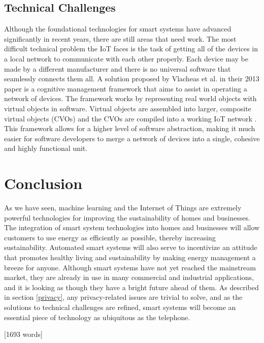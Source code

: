 \documentclass[letterpaper]{article}
\begin{document}
\subsection{Technical Challenges} \label{tech}
Although the foundational technologies for smart systems have advanced significantly in recent years, there are still areas that need work. The most difficult technical problem the IoT faces is the task of getting all of the devices in a local network to communicate with each other properly. Each device may be made by a different manufacturer and there is no universal software that seamlessly connects them all. A solution proposed by Vlacheas et al. in their 2013 paper \cite[p.~103]{vlacheas13} is a cognitive management framework that aims to assist in operating a network of devices. The framework works by representing real world objects with virtual objects in software. Virtual objects are assembled into larger, composite virtual objects (CVOs) and the CVOs are compiled into a working IoT network \cite[p.~103]{vlacheas13}. This framework allows for a higher level of software abstraction, making it much easier for software developers to merge a network of devices into a single, cohesive and highly functional unit.

\section{Conclusion} \label{conc}
As we have seen, machine learning and the Internet of Things are extremely powerful technologies for improving the sustainability of homes and businesses. The integration of smart system technologies into homes and businesses will allow customers to use energy as efficiently as possible, thereby increasing sustainability. Automated smart systems will also serve to incentivize an attitude that promotes healthy living and sustainability by making energy management a breeze for anyone. Although smart systems have not yet reached the mainstream market, they are already in use in many commercial and industrial applications, and it is looking as though they have a bright future ahead of them. As described in section \ref{privacy}, any privacy-related issues are trivial to solve, and as the solutions to technical challenges are refined, smart systems will become an essential piece of technology as ubiquitous as the telephone.

\vspace{2cm}\hfill
[1693 words]

\clearpage
\pagestyle{references}
\printbibliography
\end{document}
